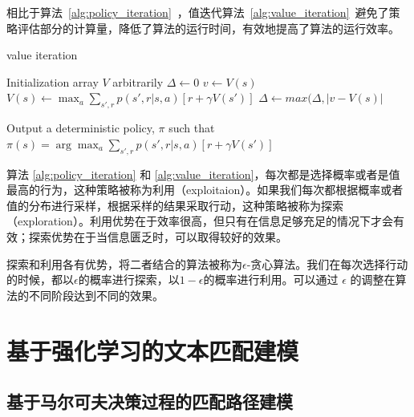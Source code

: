 相比于算法~\ref{alg:policy_iteration}~，值迭代算法~\ref{alg:value_iteration}~避免了策略评估部分的计算量，降低了算法的运行时间，有效地提高了算法的运行效率。

\begin{algorithm}[!htbp]
    \small
    \caption{value iteration}\label{alg:value_iteration}
    \begin{algorithmic}
        \STATE Initialization array $V$ arbitrarily
        \REPEAT
        \STATE $\Delta \leftarrow 0$
        \STATE $v \leftarrow V(s)$
        \STATE $V(s)\leftarrow \max_a\sum_{s', r} p(s', r|s, a)[r + \gamma V(s')]$
        \STATE $\Delta \leftarrow max(\Delta, |v-V(s)|$
        \ENDFOR
        \UNTIL {$\Delta < \theta$}

        \STATE Output a deterministic policy, $\pi$ such that
        \STATE $\pi(s) = \arg\max_a\sum_{s', r} p(s', r|s, a)[r + \gamma V(s')]$
    \end{algorithmic}
\end{algorithm}


算法 \ref{alg:policy_iteration} 和 \ref{alg:value_iteration}，每次都是选择概率或者是值最高的行为，这种策略被称为利用（exploitaion）。如果我们每次都根据概率或者值的分布进行采样，根据采样的结果采取行动，这种策略被称为探索（exploration）。利用优势在于效率很高，但只有在信息足够充足的情况下才会有效；探索优势在于当信息匮乏时，可以取得较好的效果。

探索和利用各有优势，将二者结合的算法被称为$\epsilon$-贪心算法。我们在每次选择行动的时候，都以$\epsilon$的概率进行探索，以$1-\epsilon$的概率进行利用。可以通过 $\epsilon$ 的调整在算法的不同阶段达到不同的效果。


\section{基于强化学习的文本匹配建模}
\label{sec:TM_MDP}

\subsection{基于马尔可夫决策过程的匹配路径建模}

